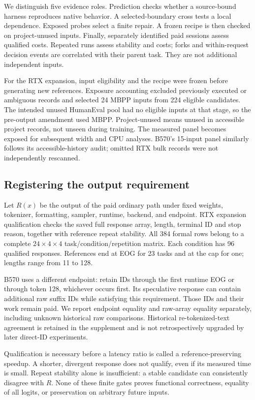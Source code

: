 We distinguish five evidence roles. Prediction checks whether a source-bound harness reproduces native behavior. A selected-boundary cross tests a local dependence. Exposed probes select a finite repair. A frozen recipe is then checked on project-unused inputs. Finally, separately identified paid sessions assess qualified costs. Repeated runs assess stability and costs; forks and within-request decision events are correlated with their parent task. They are not additional independent inputs.

For the RTX expansion, input eligibility and the recipe were frozen before generating new references. Exposure accounting excluded previously executed or ambiguous records and selected 24 MBPP inputs from 224 eligible candidates. The intended unused HumanEval pool had no eligible inputs at that stage, so the pre-output amendment used MBPP. Project-unused means unused in accessible project records, not unseen during training. The measured panel becomes exposed for subsequent width and CPU analyses. B570's 15-input panel similarly follows its accessible-history audit; omitted RTX bulk records were not independently rescanned.

\subsection{Registering the output requirement}
Let $R(x)$ be the output of the paid ordinary path under fixed weights, tokenizer, formatting, sampler, runtime, backend, and endpoint. RTX expansion qualification checks the saved full response array, length, terminal ID and stop reason, together with reference repeat stability. All 384 formal rows belong to a complete $24\times4\times4$ task/condition/repetition matrix. Each condition has 96 qualified responses. References end at EOG for 23 tasks and at the cap for one; lengths range from 11 to 128.

B570 uses a different endpoint: retain IDs through the first runtime EOG or through token 128, whichever occurs first. Its speculative response can contain additional raw suffix IDs while satisfying this requirement. Those IDs and their work remain paid. We report endpoint equality and raw-array equality separately, including unknown historical raw comparisons. Historical re-tokenized-text agreement is retained in the supplement and is not retrospectively upgraded by later direct-ID experiments.

Qualification is necessary before a latency ratio is called a reference-preserving speedup. A shorter, divergent response does not qualify, even if its measured time is small. Repeat stability alone is insufficient: a stable candidate can consistently disagree with $R$. None of these finite gates proves functional correctness, equality of all logits, or preservation on arbitrary future inputs.

